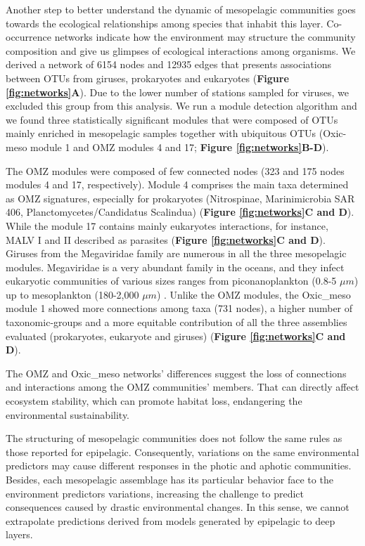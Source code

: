 \documentclass[fleqn,10pt]{wlscirep}
\begin{document}
Another step to better understand the dynamic of mesopelagic communities goes towards the ecological relationships among species that inhabit this layer. Co-occurrence networks indicate how the environment may structure the community composition and give us glimpses of ecological interactions among organisms. We derived a network of 6154 nodes and 12935 edges that presents associations between OTUs from giruses, prokaryotes and eukaryotes (\textbf{Figure \ref{fig:networks}A}). Due to the lower number of stations sampled for viruses, we excluded this group from this analysis. We run a module detection algorithm and we found three statistically significant modules that were composed of OTUs mainly enriched in mesopelagic samples together with ubiquitous OTUs (Oxic-meso module 1 and OMZ modules 4 and 17; \textbf{Figure \ref{fig:networks}B-D}).

The OMZ modules were composed of few connected nodes (323 and 175 nodes modules 4 and 17, respectively).  Module 4 comprises the main taxa determined as OMZ signatures, especially for prokaryotes (Nitrospinae, Marinimicrobia SAR 406, Planctomycetes/Candidatus Scalindua) (\textbf{Figure \ref{fig:networks}C and D}). While the module 17 contains mainly eukaryotes interactions, for instance, MALV I and II described as parasites (\textbf{Figure \ref{fig:networks}C and D}). Giruses from the Megaviridae family are numerous in all the three mesopelagic modules. Megaviridae is a very abundant family in the oceans, and they infect eukaryotic communities of various sizes ranges from piconanoplankton (0.8-5 $\mu m$) up to mesoplankton (180-2,000 $\mu m$) \cite{mihara_taxon_2018, endo_biogeography_2020}. Unlike the OMZ modules, the Oxic\_meso module 1 showed more connections among taxa (731 nodes), a higher number of taxonomic-groups and a more equitable contribution of all the three assemblies evaluated (prokaryotes, eukaryote and giruses) (\textbf{Figure \ref{fig:networks}C and D}). 

The OMZ and Oxic\_meso networks' differences suggest the loss of connections and interactions among the OMZ communities' members. That can directly affect ecosystem stability, which can promote habitat loss, endangering the environmental sustainability.

The structuring of mesopelagic communities does not follow the same rules as those reported for epipelagic. Consequently, variations on the same environmental predictors may cause different responses in the photic and aphotic communities. Besides, each mesopelagic assemblage has its particular behavior face to the environment predictors variations, increasing the challenge to predict consequences caused by drastic environmental changes. In this sense, we cannot extrapolate predictions derived from models generated by epipelagic to deep layers.
\end{document}
